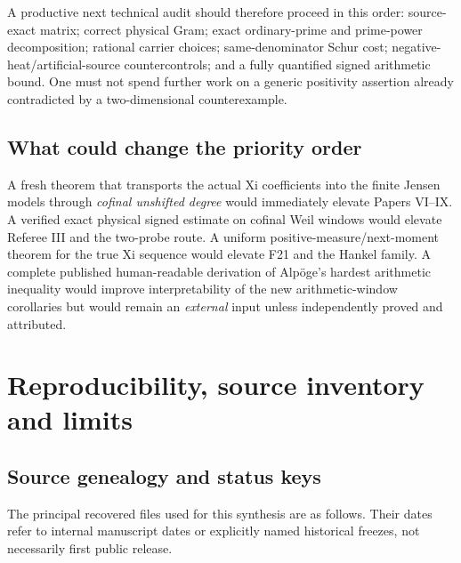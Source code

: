 \documentclass[
  10pt,
  a4paper,
  10pt,
  oneside,
  openany]{book}
\begin{document}
A productive next technical audit should therefore proceed in this
order: source-exact matrix; correct physical Gram; exact ordinary-prime
and prime-power decomposition; rational carrier choices;
same-denominator Schur cost; negative-heat/artificial-source
countercontrols; and a fully quantified signed arithmetic bound. One
must not spend further work on a generic positivity assertion already
contradicted by a two-dimensional counterexample.

\subsection{What could change the priority
order}\label{what-could-change-the-priority-order}

A fresh theorem that transports the actual Xi coefficients into the
finite Jensen models through \emph{cofinal unshifted degree} would
immediately elevate Papers VI--IX. A verified exact physical signed
estimate on cofinal Weil windows would elevate Referee III and the
two-probe route. A uniform positive-measure/next-moment theorem for the
true Xi sequence would elevate F21 and the Hankel family. A complete
published human-readable derivation of Alpöge's hardest arithmetic
inequality would improve interpretability of the new arithmetic-window
corollaries but would remain an \emph{external} input unless
independently proved and attributed.

\section{Reproducibility, source inventory and
limits}\label{reproducibility-source-inventory-and-limits}

\subsection{Source genealogy and status
keys}\label{source-genealogy-and-status-keys}

The principal recovered files used for this synthesis are as follows.
Their dates refer to internal manuscript dates or explicitly named
historical freezes, not necessarily first public release.
\end{document}

